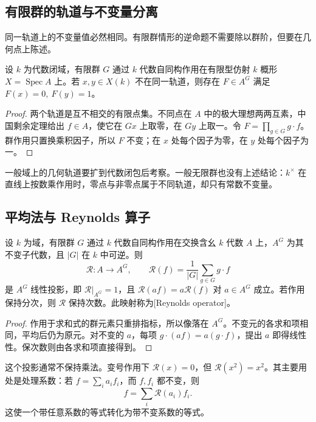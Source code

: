 \subsection{有限群的轨道与不变量分离}
\label{b5:subsec:2201:02}

同一轨道上的不变量值必然相同。有限群情形的逆命题不需要除以群阶，但要在几何点上陈述。

\begin{proposition}\label{b5:prop:finite-invariants-separate}
	设 \(k\) 为代数闭域，有限群 \(G\) 通过 \(k\) 代数自同构作用在有限型仿射 \(k\) 概形 \(X=\operatorname{Spec}A\) 上。若 \(x,y\in X(k)\) 不在同一轨道，则存在 \(F\in A^G\) 满足 \(F(x)=0,\ F(y)=1\)。
\end{proposition}
\begin{proof}
	两个轨道是互不相交的有限点集。不同点在 \(A\) 中的极大理想两两互素，中国剩余定理给出 \(f\in A\)，使它在 \(Gx\) 上取零，在 \(Gy\) 上取一。令 \(F=\prod_{g\in G}g\cdot f\)。群作用只置换乘积因子，所以 \(F\) 不变；在 \(x\) 处每个因子为零，在 \(y\) 处每个因子为一。
\end{proof}

一般域上的几何轨道要扩到代数闭包后考察。一般无限群也没有上述结论：\(k^\times\) 在直线上按数乘作用时，零点与非零点属于不同轨道，却只有常数不变量。

\subsection{平均法与 Reynolds 算子}
\label{b5:subsec:2201:03}

\begin{proposition}\label{b5:prop:invariant-reynolds}
	设 \(k\) 为域，有限群 \(G\) 通过 \(k\) 代数自同构作用在交换含幺 \(k\) 代数 \(A\) 上，\(A^G\) 为其不变子代数，且 \(|G|\) 在 \(k\) 中可逆。则
	\[
		\mathcal R:A\longrightarrow A^G,\qquad \mathcal R(f)=\frac1{|G|}\sum_{g\in G}g\cdot f
	\]
	是 \(A^G\) 线性投影，即 \(\mathcal R|_{A^G}=1\)，且 \(\mathcal R(af)=a\mathcal R(f)\) 对 \(a\in A^G\) 成立。若作用保持分次，则 \(\mathcal R\) 保持次数。此映射称为[Reynolds operator]。
\end{proposition}
\begin{proof}
	作用于求和式的群元素只重排指标，所以像落在 \(A^G\)。不变元的各求和项相同，平均后仍为原元。对不变的 \(a\)，每项 \(g\cdot(af)=a(g\cdot f)\)，提出 \(a\) 即得线性性。保次数则由各求和项直接得到。
\end{proof}

这个投影通常不保持乘法。变号作用下 \(\mathcal R(x)=0\)，但 \(\mathcal R(x^2)=x^2\)。其主要用处是处理系数：若 \(f=\sum_i a_if_i\)，而 \(f,f_i\) 都不变，则
\[
	f=\sum_i\mathcal R(a_i)f_i.
\]
这使一个带任意系数的等式转化为带不变系数的等式。

